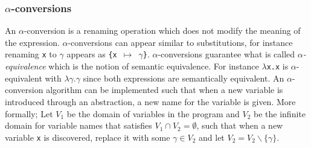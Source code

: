 \subsubsection{$\alpha$-conversions} \label{sec:alpha}
An $\alpha$-conversion is a renaming operation which does not modify the meaning of the expression.
$\alpha$-conversions can appear similar to substitutions, for instance renaming \texttt{x} to $\gamma$ appears as \texttt{\{x $\mapsto$ $\gamma$\}}.
$\alpha$-conversions guarantee what is called \textit{$\alpha$-equivalence} which is the notion of semantic equivalence.
For instance \texttt{$\lambda$x.x} is $\alpha$-equivalent with \texttt{$\lambda\gamma.\gamma$} since both expressions are semantically equivalent.
\noindent An $\alpha$-conversion algorithm can be implemented such that when a new variable is introduced through an abstraction, a new name for the variable is given.
More formally; Let $V_1$ be the domain of variables in the program and $V_2$ be the infinite domain for variable names that satisfies $V_1 \cap V_2 = \emptyset$, such that when a new variable \texttt{x} is discovered, replace it with some $\gamma \in V_2$ and let $V_2 = V_2 \backslash \{\gamma\}$. 
